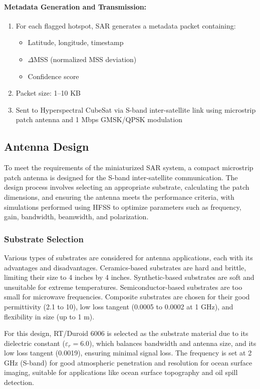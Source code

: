 \documentclass[12pt]{article}
\begin{document}
\paragraph{Metadata Generation and Transmission:}
\begin{enumerate}
    \item For each flagged hotspot, SAR generates a metadata packet containing:
    \begin{itemize}
        \item Latitude, longitude, timestamp
        \item $\Delta$MSS (normalized MSS deviation)
        \item Confidence score
    \end{itemize}
    \item Packet size: 1--10 KB
    \item Sent to Hyperspectral CubeSat via S-band inter-satellite link using microstrip patch antenna and 1 Mbps GMSK/QPSK modulation
\end{enumerate}

\subsection{Antenna Design}
To meet the requirements of the miniaturized SAR system, a compact microstrip patch antenna is designed for the S-band inter-satellite communication. The design process involves selecting an appropriate substrate, calculating the patch dimensions, and ensuring the antenna meets the performance criteria, with simulations performed using HFSS to optimize parameters such as frequency, gain, bandwidth, beamwidth, and polarization.

\subsubsection{Substrate Selection}
Various types of substrates are considered for antenna applications, each with its advantages and disadvantages. Ceramics-based substrates are hard and brittle, limiting their size to 4 inches by 4 inches. Synthetic-based substrates are soft and unsuitable for extreme temperatures. Semiconductor-based substrates are too small for microwave frequencies. Composite substrates are chosen for their good permittivity (2.1 to 10), low loss tangent (0.0005 to 0.0002 at 1 GHz), and flexibility in size (up to 1 m).

For this design, RT/Duroid 6006 is selected as the substrate material due to its dielectric constant ($\varepsilon_r = 6.0$), which balances bandwidth and antenna size, and its low loss tangent (0.0019), ensuring minimal signal loss. The frequency is set at 2 GHz (S-band) for good atmospheric penetration and resolution for ocean surface imaging, suitable for applications like ocean surface topography and oil spill detection.
\end{document}
